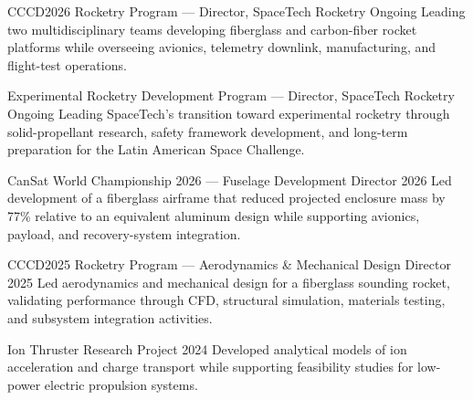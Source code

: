 \cvsection{\ProjectsLabel}

\cvproject
{CCCD2026 Rocketry Program --- Director, SpaceTech Rocketry}
{Ongoing}
{
Leading two multidisciplinary teams developing fiberglass and carbon-fiber rocket platforms while overseeing avionics, telemetry downlink, manufacturing, and flight-test operations.
}

\cvproject
{Experimental Rocketry Development Program --- Director, SpaceTech Rocketry}
{Ongoing}
{
Leading SpaceTech's transition toward experimental rocketry through solid-propellant research, safety framework development, and long-term preparation for the Latin American Space Challenge.
}

\cvproject
{CanSat World Championship 2026 --- Fuselage Development Director}
{2026}
{
Led development of a fiberglass airframe that reduced projected enclosure mass by 77\% relative to an equivalent aluminum design while supporting avionics, payload, and recovery-system integration.
}

\cvproject
{CCCD2025 Rocketry Program --- Aerodynamics \& Mechanical Design Director}
{2025}
{
Led aerodynamics and mechanical design for a fiberglass sounding rocket, validating performance through CFD, structural simulation, materials testing, and subsystem integration activities.
}

\cvproject
{Ion Thruster Research Project}
{2024}
{
Developed analytical models of ion acceleration and charge transport while supporting feasibility studies for low-power electric propulsion systems.
}

